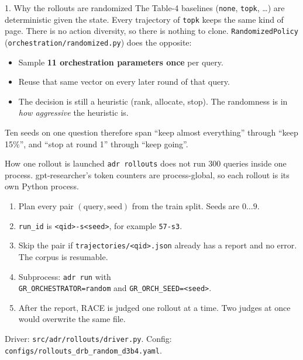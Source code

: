 \documentclass[aspectratio=169,11pt]{beamer}
\begin{document}
\begin{frame}{1. Why the rollouts are randomized}
  The Table-4 baselines (\texttt{none}, \texttt{topk}, \ldots) are deterministic given the state.
  Every trajectory of \texttt{topk} keeps the same kind of page. There is no action diversity, so there is nothing to clone.
  \vspace{0.4em}
  \texttt{RandomizedPolicy} (\texttt{orchestration/randomized.py}) does the opposite:
  \begin{itemize}
    \item Sample \textbf{11 orchestration parameters once} per query.
    \item Reuse that same vector on every later round of that query.
    \item The decision is still a heuristic (rank, allocate, stop). The randomness is in \emph{how aggressive} the heuristic is.
  \end{itemize}
  \vspace{0.3em}
  Ten seeds on one question therefore span ``keep almost everything'' through ``keep 15\%'', and ``stop at round 1'' through ``keep going''.
\end{frame}

\begin{frame}{How one rollout is launched}
  \texttt{adr rollouts} does not run 300 queries inside one process.
  gpt-researcher's token counters are process-global, so each rollout is its own Python process.
  \vspace{0.3em}
  \begin{enumerate}
    \item Plan every pair $(\text{query}, \text{seed})$ from the train split. Seeds are $0 \ldots 9$.
    \item \texttt{run\_id} is \texttt{<qid>-s<seed>}, for example \texttt{57-s3}.
    \item Skip the pair if \texttt{trajectories/<qid>.json} already has a report and no error. The corpus is resumable.
    \item Subprocess: \texttt{adr run} with\\
      \texttt{GR\_ORCHESTRATOR=random} and \texttt{GR\_ORCH\_SEED=<seed>}.
    \item After the report, RACE is judged one rollout at a time. Two judges at once would overwrite the same file.
  \end{enumerate}
  \vspace{0.3em}
  {\small Driver: \texttt{src/adr/rollouts/driver.py}. Config: \texttt{configs/rollouts\_drb\_random\_d3b4.yaml}.}
\end{frame}
\end{document}
